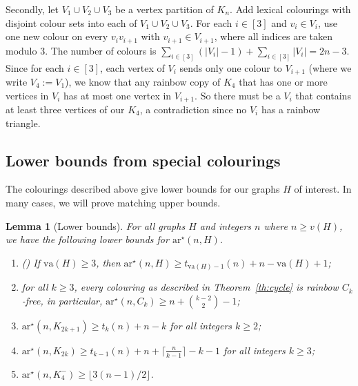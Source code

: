 \documentclass[a4paper, 12pt]{article}
\numberwithin{equation}{section}
\newtheorem{lemma}[theorem]{Lemma}
\def\sar{{\mathrm{ar}^{\star}}}
\def\va{{\mathrm{va}}}
\begin{document}
Secondly, let $V_1 \cup V_2 \cup V_3$ be a vertex partition of $K_n$. Add lexical colourings with disjoint colour sets into each of $V_1 \cup V_2 \cup V_3$. For each $i \in [3]$ and $v_i \in V_i$, use one new colour on every $v_iv_{i+1}$ with $v_{i+1} \in V_{i+1}$, where all indices are taken modulo $3$. 
The number of colours is $\sum_{i \in [3]}(|V_i|-1) + \sum_{i \in [3]}|V_i| = 2n-3$.
Since for each $i \in [3]$, each vertex of  $V_i$ sends only one colour to $V_{i+1}$ (where we write $V_4 := V_1$), we know that any rainbow copy of $K_4$ that has one or more vertices in $V_i$ has at most one vertex in $V_{i+1}$. So there must be a $V_i$ that contains at least three vertices of our $K_4$, a contradiction since no $V_i$ has a rainbow triangle.



\subsection{Lower bounds from special colourings}

The colourings described above give lower bounds for our graphs $H$ of interest. In many cases, we will prove matching upper bounds.

\begin{lemma}[Lower bounds]\label{lm:lower}
For all graphs $H$ and integers $n$ where $n \geq v(H)$, we have the following lower bounds for $\sar(n,H)$.
    \begin{enumerate}
    \item \emph{(\cite{AxenovichIverson})} If $\va(H) \geq 3$, then $\sar(n,H) \geq t_{\va(H)-1}(n)+n-\va(H)+1$;
\item for all $k \geq 3$, every colouring as described in Theorem~\ref{th:cycle} 
is rainbow $C_k$-free,     
in particular, $\sar(n,C_k) \geq n + \binom{k-2}{2}-1$;
\item $\sar(n,K_{2k+1}) \geq t_{k}(n) + n -k$ for all integers $ k \geq 2$;
\item $\sar(n,K_{2k}) \geq t_{k-1}(n) + n + \lceil \frac{n}{k-1}\rceil-k-1$ for all integers $k \geq 3$; 
\item $\sar(n,K_4^-) \geq \lfloor 3(n-1)/2\rfloor$.
    \end{enumerate}
\end{lemma}
\end{document}
